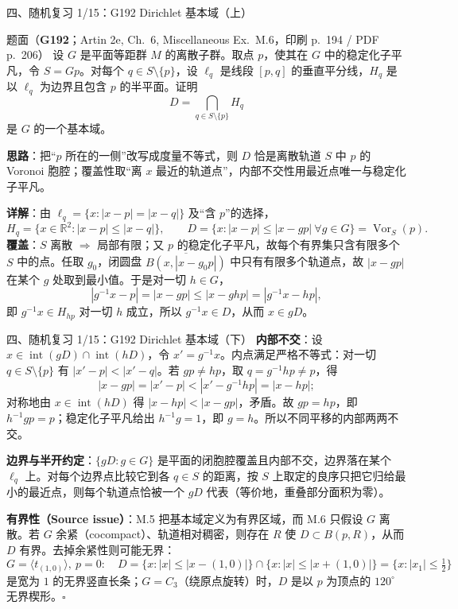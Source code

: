 \documentclass[aspectratio=169,10pt,fontset=none]{ctexbeamer}
\newcommand{\ex}[1]{\textcolor{accent}{\footnotesize\bfseries #1}}
\newcommand{\key}[1]{\textcolor{ink}{\bfseries #1}}
\begin{document}
\begin{frame}[t]{四、随机复习 1/15：G192 Dirichlet 基本域（上）}
\label{ex:G192}
\scriptsize
\begin{block}{\footnotesize 题面（\ex{G192}；Artin 2e, Ch.~6, Miscellaneous Ex.~M.6，印刷 p.~194 / PDF p.~206）}
设 $G$ 是平面等距群 $M$ 的离散子群。取点 $p$，使其在 $G$ 中的稳定化子平凡，令 $S=Gp$。对每个 $q\in S\setminus\{p\}$，设 $\ell_q$ 是线段 $[p,q]$ 的垂直平分线，$H_q$ 是以 $\ell_q$ 为边界且包含 $p$ 的半平面。证明
\[ D=\bigcap_{q\in S\setminus\{p\}}H_q \]
是 $G$ 的一个基本域。
\end{block}
\key{思路}：把“$p$ 所在的一侧”改写成度量不等式，则 $D$ 恰是离散轨道 $S$ 中 $p$ 的 Voronoi 胞腔；覆盖性取“离 $x$ 最近的轨道点”，内部不交性用最近点唯一与稳定化子平凡。

\key{详解}：由 $\ell_q=\{x:|x-p|=|x-q|\}$ 及“含 $p$”的选择，
\[ H_q=\{x\in\mathbb R^2:|x-p|\le|x-q|\},\qquad D=\{x:|x-p|\le|x-gp|\ \forall g\in G\}=\operatorname{Vor}_S(p). \]
\textbf{覆盖}：$S$ 离散 $\Rightarrow$ 局部有限；又 $p$ 的稳定化子平凡，故每个有界集只含有限多个 $S$ 中的点。任取 $g_0$，闭圆盘 $\overline{B(x,|x-g_0p|)}$ 中只有有限多个轨道点，故 $|x-gp|$ 在某个 $g$ 处取到最小值。于是对一切 $h\in G$，
\[ |g^{-1}x-p|=|x-gp|\le|x-ghp|=|g^{-1}x-hp|, \]
即 $g^{-1}x\in H_{hp}$ 对一切 $h$ 成立，所以 $g^{-1}x\in D$，从而 $x\in gD$。
\end{frame}

\begin{frame}[t]{四、随机复习 1/15：G192 Dirichlet 基本域（下）}
\scriptsize
\key{内部不交}：设 $x\in\operatorname{int}(gD)\cap\operatorname{int}(hD)$，令 $x'=g^{-1}x$。内点满足严格不等式：对一切 $q\in S\setminus\{p\}$ 有 $|x'-p|<|x'-q|$。若 $gp\ne hp$，取 $q=g^{-1}hp\ne p$，得
\[ |x-gp|=|x'-p|<|x'-g^{-1}hp|=|x-hp|; \]
对称地由 $x\in\operatorname{int}(hD)$ 得 $|x-hp|<|x-gp|$，矛盾。故 $gp=hp$，即 $h^{-1}gp=p$；稳定化子平凡给出 $h^{-1}g=1$，即 $g=h$。所以不同平移的内部两两不交。

\key{边界与半开约定}：$\{gD:g\in G\}$ 是平面的闭胞腔覆盖且内部不交，边界落在某个 $\ell_q$ 上。对每个边界点比较它到各 $q\in S$ 的距离，按 $S$ 上取定的良序只把它归给最小的最近点，则每个轨道点恰被一个 $gD$ 代表（等价地，重叠部分面积为零）。

\key{有界性（Source issue）}：M.5 把基本域定义为有界区域，而 M.6 只假设 $G$ 离散。若 $G$ 余紧（cocompact）、轨道相对稠密，则存在 $R$ 使 $D\subset B(p,R)$，从而 $D$ 有界。去掉余紧性则可能无界：
\[ G=\langle t_{(1,0)}\rangle,\ p=0:\quad D=\{x:|x|\le|x-(1,0)|\}\cap\{x:|x|\le|x+(1,0)|\}=\{x:|x_1|\le\tfrac12\} \]
是宽为 $1$ 的无界竖直长条；$G=C_3$（绕原点旋转）时，$D$ 是以 $p$ 为顶点的 $120^\circ$ 无界楔形。$\square$
\end{frame}
\end{document}
